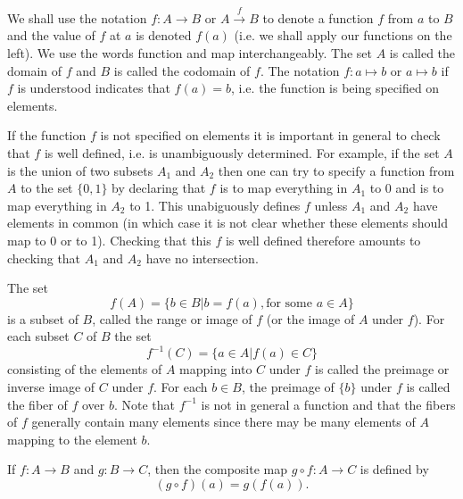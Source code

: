 \documentclass[cn,11pt,chinese]{elegantbook}
\numberwithin{equation}{section}
\begin{document}
We shall use the notation $f: A \to B$ or $A \stackrel{f}{\rightarrow} B$ to denote a function $f$ from $a$ to $B$ and the value of $f$ at $a$ is denoted $f(a)$ (i.e. we shall apply our functions on the left). We use the words function and map interchangeably. The set $A$ is called the domain of $f$ and $B$ is called the codomain of $f$. The notation $f: a \mapsto b$ or $a \mapsto b$ if $f$ is understood indicates that $f(a)=b$, i.e. the function is being specified on elements.

If the function $f$ is not specified on elements it is important in general to check that $f$ is well defined, i.e. is unambiguously determined. For example, if the set $A$ is the union of two subsets $A_1$ and $A_2$ then one can try to specify a function from $A$ to the set $\{0, 1\}$ by declaring that $f$ is to map everything in $A_1$ to 0 and is to map everything in $A_2$ to 1. This unabiguously defines $f$ unless $A_1$ and $A_2$ have elements in common (in which case it is not clear whether these elements should map to 0 or to 1). Checking that this $f$ is well defined therefore amounts to checking that $A_1$ and $A_2$ have no intersection.

The set
\[
f(A) = \{b \in B | b = f(a), \text{for some } a \in A\}
\]
is a subset of $B$, called the range or image of $f$ (or the image of $A$ under $f$). For each subset $C$ of $B$ the set
\[
f^{-1}(C) = \{a \in A | f(a) \in C\}
\]
consisting of the elements of $A$ mapping into $C$ under $f$ is called the preimage or inverse image of $C$ under $f$. For each $b \in B$, the preimage of $\{b\}$ under $f$ is called the fiber of $f$ over $b$. Note that $f^{-1}$ is not in general a function and that the fibers of $f$ generally contain many elements since there may be many elements of $A$ mapping to the element $b$.

If $f:A \to B$ and $g: B \to C$, then the composite map $g \circ f: A \to C$ is defined by
\[
(g \circ f)(a) = g(f(a)).
\]
\end{document}
